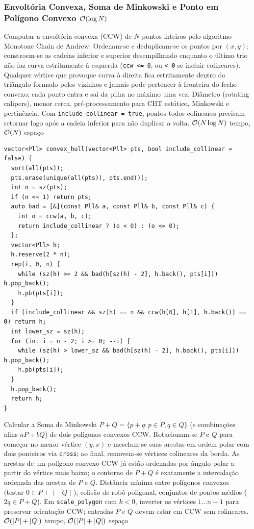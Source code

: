 \subsubsection{Envoltória Convexa, Soma de Minkowski e Ponto em Polígono Convexo $\mathcal{O}(\log N)$}
\algobox
  {Computar a envoltória convexa (CCW) de $N$ pontos inteiros pelo algoritmo Monotone Chain de Andrew.}
  {Ordenam-se e deduplicam-se os pontos por $(x, y)$; constroem-se as cadeias inferior e superior desempilhando enquanto o último trio não faz curva estritamente à esquerda (\texttt{ccw <= 0}, ou \texttt{< 0} se incluir colineares).}
  {Qualquer vértice que provoque curva à direita fica estritamente dentro do triângulo formado pelos vizinhos e jamais pode pertencer à fronteira do fecho convexo; cada ponto entra e sai da pilha no máximo uma vez.}
  {Diâmetro (rotating calipers), menor cerca, pré-processamento para CHT estático, Minkowski e pertinência.}
  {Com \texttt{include\_collinear = true}, pontos todos colineares precisam retornar logo após a cadeia inferior para não duplicar a volta.}
  {$\mathcal{O}(N \log N)$ tempo, $\mathcal{O}(N)$ espaço}

\begin{lstlisting}
vector<Pll> convex_hull(vector<Pll> pts, bool include_collinear = false) {
  sort(all(pts));
  pts.erase(unique(all(pts)), pts.end());
  int n = sz(pts);
  if (n <= 1) return pts;
  auto bad = [&](const Pll& a, const Pll& b, const Pll& c) {
    int o = ccw(a, b, c);
    return include_collinear ? (o < 0) : (o <= 0);
  };
  vector<Pll> h;
  h.reserve(2 * n);
  rep(i, 0, n) {
    while (sz(h) >= 2 && bad(h[sz(h) - 2], h.back(), pts[i])) h.pop_back();
    h.pb(pts[i]);
  }
  if (include_collinear && sz(h) == n && ccw(h[0], h[1], h.back()) == 0) return h;
  int lower_sz = sz(h);
  for (int i = n - 2; i >= 0; --i) {
    while (sz(h) > lower_sz && bad(h[sz(h) - 2], h.back(), pts[i])) h.pop_back();
    h.pb(pts[i]);
  }
  h.pop_back();
  return h;
}
\end{lstlisting}

\algobox
  {Calcular a Soma de Minkowski $P + Q = \{p + q : p \in P, q \in Q\}$ (e combinações afins $aP + bQ$) de dois polígonos convexos CCW.}
  {Rotacionam-se $P$ e $Q$ para começar no menor vértice $(y, x)$ e mesclam-se suas arestas em ordem polar com dois ponteiros via \texttt{cross}; ao final, removem-se vértices colineares da borda.}
  {As arestas de um polígono convexo CCW já estão ordenadas por ângulo polar a partir do vértice mais baixo; o contorno de $P + Q$ é exatamente a intercalação ordenada das arestas de $P$ e $Q$.}
  {Distância mínima entre polígonos convexos (testar $0 \in P + (-Q)$), colisão de robô poligonal, conjuntos de pontos médios ($2q \in P + Q$).}
  {Em \texttt{scale\_polygon} com $k < 0$, inverter os vértices $1 \dots n-1$ para preservar orientação CCW; entradas $P$ e $Q$ devem estar em CCW sem colineares.}
  {$\mathcal{O}(|P| + |Q|)$ tempo, $\mathcal{O}(|P| + |Q|)$ espaço}

